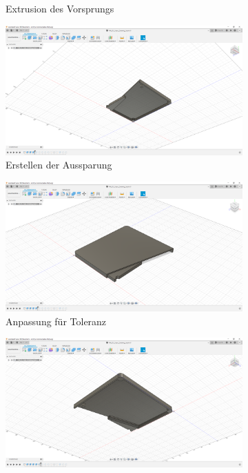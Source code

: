\begin{figure}[H]
\begin{subfigure}[t]{.3\linewidth}
		\caption[Extrusion des Vorsprungs]{Extrusion des Vorsprungs}
		\label{fig:design-back-03}
	\end{subfigure}
	\begin{subfigure}[t]{.3\linewidth}
		\includegraphics[width=\linewidth]{img/konstruktion_gehaeuse_hinten_004.png}
		\caption[Erstellen der Aussparung]{Erstellen der Aussparung}
		\label{fig:design-back-04}
	\end{subfigure}
	\begin{subfigure}[t]{.3\linewidth}
		\includegraphics[width=\linewidth]{img/konstruktion_gehaeuse_hinten_005.png}
		\caption[Anpassung für Toleranz]{Anpassung für Toleranz}
		\label{fig:design-back-05}
	\end{subfigure}
	\begin{subfigure}[t]{.3\linewidth}
		\includegraphics[width=\linewidth]{img/konstruktion_gehaeuse_hinten_006.png}

\end{subfigure}
\end{figure}
